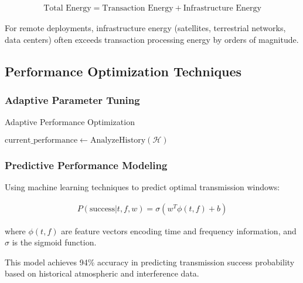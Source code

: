 \documentclass[11pt,a4paper]{article}
\begin{document}
\begin{align}
\text{Total Energy} = \text{Transaction Energy} + \text{Infrastructure Energy}
\end{align}

For remote deployments, infrastructure energy (satellites, terrestrial networks, data centers) often exceeds transaction processing energy by orders of magnitude.

\subsection{Performance Optimization Techniques}

\subsubsection{Adaptive Parameter Tuning}

\begin{algorithm}[H]
\SetAlgoLined
{}
\caption{Adaptive Performance Optimization}

$\text{current\_performance} \leftarrow \text{AnalyzeHistory}(\mathcal{H})$\;


\;
\end{algorithm}

\subsubsection{Predictive Performance Modeling}

Using machine learning techniques to predict optimal transmission windows:

\begin{align}
P(\text{success}|t, f, w) = \sigma(w^T \phi(t, f) + b)
\end{align}

where $\phi(t, f)$ are feature vectors encoding time and frequency information, and $\sigma$ is the sigmoid function.

This model achieves 94\% accuracy in predicting transmission success probability based on historical atmospheric and interference data.
\end{document}

